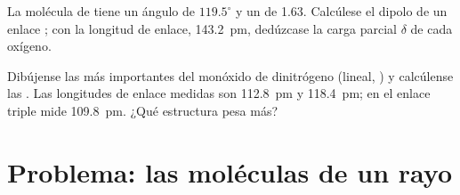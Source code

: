 \begin{exercise}[$\star\star\star$]\label{exo:b1:lewis-resonance-vsepr:11}
La molécula de  tiene un ángulo de $119.5^\circ$ y un  de \qty{1.63}{\debye}. Calcúlese el dipolo de un enlace ;
con la longitud de enlace, \qty{143.2}{pm}, dedúzcase la carga parcial
$\delta$ de cada oxígeno.
\end{exercise}

\begin{exercise}[$\star\star\star$]\label{exo:b1:lewis-resonance-vsepr:12}
Dibújense las  más importantes del monóxido de
dinitrógeno  (lineal, ) y calcúlense las . Las longitudes de enlace medidas son  \qty{112.8}{pm} y
 \qty{118.4}{pm}; en  el enlace triple mide
\qty{109.8}{pm}. ¿Qué estructura pesa más?
\end{exercise}

\section{Problema: las moléculas de un rayo}

